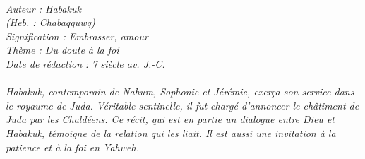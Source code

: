 \BFont
\noindent\hrulefill
{\footnotesize
\textit{
\bigskip
{\centering{}
\\Auteur : Habakuk
\\(Heb. : Chabaqquwq)
\\Signification : Embrasser, amour
\\Thème : Du doute à la foi
\\Date de rédaction : 7 siècle av. J.-C.\\}
}
\textit{
\\Habakuk, contemporain de Nahum, Sophonie et Jérémie, exerça son service dans le royaume de Juda. Véritable sentinelle, il fut chargé d'annoncer le châtiment de Juda par les Chaldéens. Ce récit, qui est en partie un dialogue entre Dieu et Habakuk, témoigne de la relation qui les liait. Il est aussi une invitation à la patience et à la foi en Yahweh.\bigskip
}
}
\par\nobreak\noindent\hrulefill
